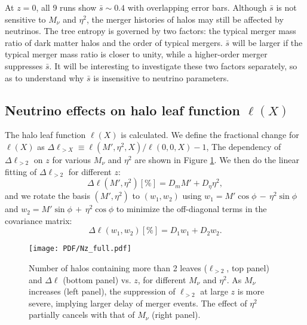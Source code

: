 At $z=0$, all 9 runs show $\bar s\sim 0.4$ with overlapping error bars.
Although $\bar s$ is not sensitive to $M_\nu$ and $\eta^2$, the merger histories of halos may still be affected by neutrinos.
The tree entropy is governed by two factors: the typical merger mass ratio of dark matter halos and the order of typical mergers. $\bar s$ will be larger if the typical merger mass ratio is closer to unity, while a higher-order merger suppresses $\bar s$. 
It will be interesting to investigate these two factors separately, so as to understand why $\bar s$ is insensitive to neutrino parameters.



\subsection{Neutrino effects on halo leaf function $\ell(X)$}
The halo leaf function $\ell(X)$ is calculated.
We define the fractional change for $\ell(X)$ as $\Delta \ell_{>X} \equiv \ell(M', \eta^2, X) /\ell(0, 0, X) - 1$,
The dependency of $\Delta \ell_{>2}$ on $z$ for various $M_\nu$ and $\eta^2$ are shown in Figure \ref{fig:N_x}. We then do the linear fitting of $\Delta \ell_{>2}$ for different $z$:
\begin{equation}
\label{eq:reg_dN}
    \Delta \ell(M', \eta^2)[\%] = D_m  M' + D_\eta\eta^2,
\end{equation}
and we rotate the basis $(M', \eta^2)$ to $(w_1, w_2)$ using $w_1 = M' \cos \phi\, -\, \eta^2 \sin \phi$ and $w_2 = M' \sin \phi \,+\, \eta^2 \cos \phi$ to minimize the off-diagonal terms in the covariance matrix:\
\begin{equation}
\label{eq:reg_dN_w}
    \Delta \ell(w_1, w_2)[\%]= D_1 w_1 + D_2 w_2.
\end{equation}
\begin{figure}[!h]
		\begin{center}%
		\texttt{[image: PDF/Nz\_full.pdf]}
		\caption{\label{fig:N_x}Number of halos containing more than 2 leaves ($\ell_{>2}$, top panel) and $\Delta \ell$ (bottom panel) vs. $z$, for different $M_\nu$ and $\eta^2$.  As $M_\nu$ increases (left panel), the suppression of $\ell_{>2}$ at large $z$ is more severe, implying larger delay of  merger events. The effect of $\eta^2$ partially cancels with that of $M_\nu$ (right panel). }
		\end{center}
\end{figure}
